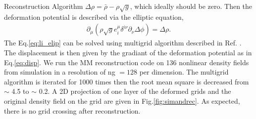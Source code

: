 \begin{section}{Reconstruction Algorithm}
$\Delta \rho = \bar{\rho}-\rho \sqrt{g}$, which ideally should be zero. Then the 
deformation potential is described via the elliptic equation,
\begin{align}
 \label{eq:li_elip}
    \partial _\mu (\rho \sqrt{g} e^\mu _i \delta^{i\nu}\partial_\nu \Delta \phi)=\Delta \rho.
\end{align}
The Eq.\ref{eq:li_elip} can be solved using multigrid algorithm described in Ref. 
\cite{bib:Pen1995,bib:Pen1998}. The displacement is then given by the gradiant of the deformation 
potential as in Eq.\ref{eq:disp}. We run the MM reconstruction code on 136 nonlinear density fields from simulation 
in a resolution of ng $=128$ per dimension. The multigrid algorithm is iterated for 1000 times then the root mean square  
is decreased from $\sim$ 4.5 to $\sim$ 0.2. 
A 2D projection of one layer of the deformed grids and the 
original density field on the grid are given in Fig.\ref{fig:simandrec}. 
As expected, there is no grid crossing after reconstruction.
%
\end{section}

